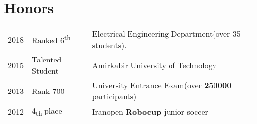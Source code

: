\documentclass[]{plushcv}
\begin{document}
\begin{minipage}[t]{0.70\textwidth}
\begin{tightemize}
\end{tightemize}



\section{Honors} 
\begin{tabular}{rll}
2018	     & Ranked 6\textsuperscript{th}  & Electrical Engineering Department(over 35 students).\\
2015	     & Talented Student & Amirkabir University of Technology \\
2013        &  Rank 700  & University Entrance Exam(over \textbf{250000} participants) \\
2012        & 4\textsubscript{th} place & Iranopen \textbf{Robocup} junior soccer
\end{tabular}
%
%

\end{minipage} 
\hfill
\end{document}
